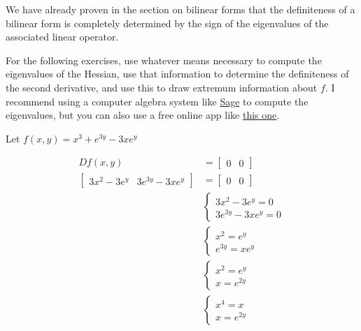 \documentclass{ximera}
\begin{document}
	We have already proven in the section on bilinear forms that the definiteness of a bilinear form is completely determined by the sign
	of the eigenvalues of the associated linear operator.
	
	For the following exercises, use whatever means necessary to compute the eigenvalues of the Hessian, use that information to determine the 
	definiteness of the second derivative, and use this to draw extremum information about $f$.  I recommend using a computer algebra system like 
	\href{http://www.sagemath.org/}{Sage} to compute the eigenvalues, 
	but you can also use a free online app like \href{http://www.bluebit.gr/matrix-calculator/}{this one}. 
	
	\begin{question}
		Let $f(x,y) = x^3+e^{3y}-3xe^{y}$
		\begin{solution}
			\begin{hint}
				\begin{align*}
					Df(x,y)  &= \begin{bmatrix} 0 & 0\end{bmatrix}\\
					\begin{bmatrix} 3x^2-3e^y & 3e^{3y}-3xe^y\end{bmatrix} &= \begin{bmatrix} 0 & 0\end{bmatrix}\\
					&\begin{cases}
						3x^2-3e^y = 0\\
						3e^{3y}-3xe^y = 0
					\end{cases}\\
					&\begin{cases}
						x^2=e^y\\
						e^{3y}=xe^y
					\end{cases}\\
					&\begin{cases}
						x^2=e^y\\
						x=e^{2y}
					\end{cases}\\
					&\begin{cases}
						x^4=x\\
						x=e^{2y}
					\end{cases}
				\end{align*}
				

\end{hint}
\end{solution}
\end{question}
\end{document}
